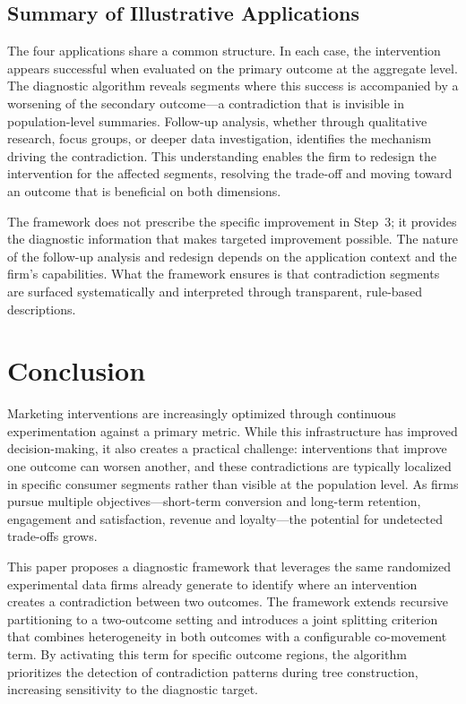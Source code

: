 \documentclass[11pt,letterpaper,english]{article}
\theoremstyle{definition}
\theoremstyle{definition}
\begin{document}
\begin{bibunit}
\subsection{Summary of Illustrative Applications}
\label{sec:app-summary}

The four applications share a common structure. In each case, the intervention appears successful when evaluated on the primary outcome at the aggregate level. The diagnostic algorithm reveals segments where this success is accompanied by a worsening of the secondary outcome---a contradiction that is invisible in population-level summaries. Follow-up analysis, whether through qualitative research, focus groups, or deeper data investigation, identifies the mechanism driving the contradiction. This understanding enables the firm to redesign the intervention for the affected segments, resolving the trade-off and moving toward an outcome that is beneficial on both dimensions.

The framework does not prescribe the specific improvement in Step~3; it provides the diagnostic information that makes targeted improvement possible. The nature of the follow-up analysis and redesign depends on the application context and the firm's capabilities. What the framework ensures is that contradiction segments are surfaced systematically and interpreted through transparent, rule-based descriptions.


\section{Conclusion}
\label{sec:conclusion}

Marketing interventions are increasingly optimized through continuous experimentation against a primary metric. While this infrastructure has improved decision-making, it also creates a practical challenge: interventions that improve one outcome can worsen another, and these contradictions are typically localized in specific consumer segments rather than visible at the population level. As firms pursue multiple objectives---short-term conversion and long-term retention, engagement and satisfaction, revenue and loyalty---the potential for undetected trade-offs grows.

This paper proposes a diagnostic framework that leverages the same randomized experimental data firms already generate to identify where an intervention creates a contradiction between two outcomes. The framework extends recursive partitioning to a two-outcome setting and introduces a joint splitting criterion that combines heterogeneity in both outcomes with a configurable co-movement term. By activating this term for specific outcome regions, the algorithm prioritizes the detection of contradiction patterns during tree construction, increasing sensitivity to the diagnostic target.


\end{bibunit}
\end{document}
